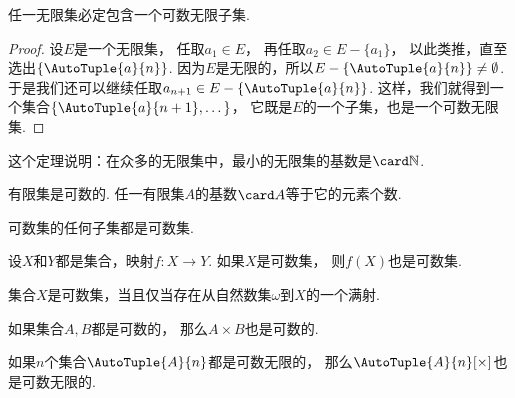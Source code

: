 \begin{theorem}
任一无限集必定包含一个可数无限子集.
\begin{proof}
设\(E\)是一个无限集，
任取\(a_1 \in E\)，
再任取\(a_2 \in E-\{a_1\}\)，
以此类推，直至选出\(\{\AutoTuple{a}{n}\}\).
因为\(E\)是无限的，所以\(E-\{\AutoTuple{a}{n}\}\neq\emptyset\).
于是我们还可以继续任取\(a_{n+1} \in E-\{\AutoTuple{a}{n}\}\).
这样，我们就得到一个集合\(\{\AutoTuple{a}{n+1},\dotsc\}\)，
它既是\(E\)的一个子集，也是一个可数无限集.
\end{proof}
\end{theorem}
\begin{remark}
这个定理说明：在众多的无限集中，最小的无限集的基数是\(\card\mathbb{N}\).
\end{remark}

\begin{proposition}
有限集是可数的.
任一有限集\(A\)的基数\(\card A\)等于它的元素个数.
\end{proposition}

\begin{proposition}
可数集的任何子集都是可数集.
\end{proposition}

\begin{proposition}
设\(X\)和\(Y\)都是集合，映射\(f\colon X\to Y\).
如果\(X\)是可数集，
则\(f(X)\)也是可数集.
\end{proposition}

\begin{proposition}
集合\(X\)是可数集，当且仅当存在从自然数集\(\omega\)到\(X\)的一个满射.
\end{proposition}

\begin{proposition}
如果集合\(A,B\)都是可数的，
那么\(A \times B\)也是可数的.
\end{proposition}

\begin{proposition}
如果\(n\)个集合\(\AutoTuple{A}{n}\)都是可数无限的，
那么\(\AutoTuple{A}{n}[\times]\)也是可数无限的.
\end{proposition}

